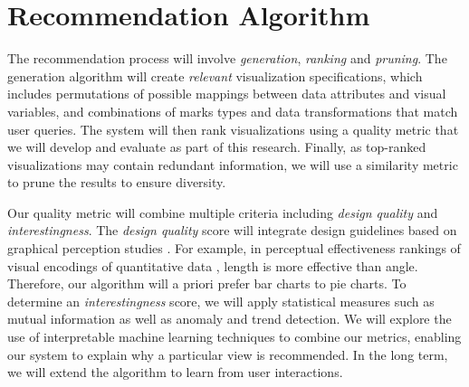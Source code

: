 \section*{Recommendation Algorithm}

The recommendation process will involve \textit{generation}, \textit{ranking} and \textit{pruning}.  The generation algorithm will create \textit{relevant} visualization specifications,  which includes permutations of possible mappings between data attributes and visual variables, and combinations of marks types and data transformations that match user queries.  The system will then rank visualizations using a quality metric that we will develop and evaluate as part of this research. Finally, as top-ranked visualizations may contain redundant information,  we will use a similarity metric to prune the results to ensure diversity.

Our quality metric will combine multiple criteria including \textit{design quality} and \textit{interestingness}. The \textit{design quality} score will integrate design guidelines based on graphical perception studies \cite{cleveland:perception}.  For example, in perceptual effectiveness rankings of visual encodings of quantitative data \cite{mackinlay:apt}, length is more effective than angle.  Therefore, our algorithm will a priori prefer bar charts to pie charts.  To determine an \textit{interestingness} score, we will apply statistical measures such as mutual information\cite{wang:maximum} as well as anomaly and trend detection\cite{chandola:anomaly}. We will explore the use of interpretable machine learning techniques \cite{letham:interpretable} to combine our metrics, enabling our system to explain why a particular view is recommended. In the long term, we will extend the algorithm to learn from user interactions.